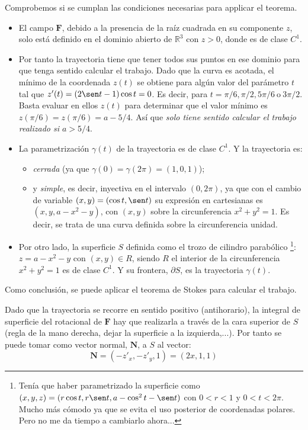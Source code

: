 \documentclass[11pt]{article}
\newcommand{\R}{\mathbb{R}}
\newcommand{\g}{\gamma}
\begin{document}
Comprobemos si se cumplan las condiciones necesarias para applicar el teorema.
\begin{itemize}
    \item El campo \( \mathbf{F}\), debido a la presencia de la raíz cuadrada en su componente \(z\), solo está definido  en el dominio abierto de \(\R^3\) con \(z>0\), donde es de clase \(C^1\).
    \item Por tanto la trayectoria tiene que tener todos sus puntos en ese dominio para que tenga sentido calcular el trabajo.
          Dado que la curva es acotada, el mínimo de la coordenada \(z(t)\) se obtiene para algún valor del parámetro \(t\) tal que \(z'(t)= (2 \sen t -1)\cos{t}=0\). Es decir, para \(t=\pi/6, \pi/2, 5\pi/6 \ \textrm{o}\  3\pi/2\). Basta evaluar en ellos \(z(t)\) para determinar que el valor mínimo es \(z(\pi/6)=z(\pi/6)=a-5/4\). Así que \emph{solo tiene sentido calcular el trabajo realizado si \(a>5/4\)}.
    \item La parametrización \( \g(t)\) de la trayectoria es de clase \(C^1\). Y la trayectoria es:
          \begin{itemize}
              \item \emph{cerrada} (ya que \(\g(0) = \g(2 \pi)=(1,0,1)\));
              \item y \emph{simple}, es decir, inyectiva en el intervalo \((0,2\pi)\), ya que con el cambio de variable \((x,y)=(\cos{t},\sen t)\) su expresión en cartesianas es \((x,y,a-x^2-y)\), con \((x,y)\) sobre la circunferencia \(x^2+y^2=1\). Es decir, se trata de una curva definida sobre la circunferencia unidad.
          \end{itemize}
    \item Por otro lado, la superficie \(S\) definida como el trozo de cilindro parabólico \footnote{Tenía que haber parametrizado la superficie como \((x,y,z)=(r \cos t,r \sen t,a- \cos^2t - \sen t)\) con \(0 < r < 1\) y \( 0 < t < 2 \pi\). Mucho más cómodo ya que se evita el uso posterior de coordenadas polares. Pero no me da tiempo a cambiarlo ahora...}: \(z=a-x^2-y\) con \((x,y) \in R\), siendo \(R\) el interior de la circunferencia \(x^2+y^2=1\) es de clase \(C^1\). Y su frontera, \(\partial S\), es la trayectoria \(\g(t)\).
\end{itemize}

Como conclusión, se puede aplicar el teorema de Stokes para calcular el trabajo.

Dado que la trayectoria se recorre en sentido positivo (antihorario), la integral de superficie del rotacional de \(\mathbf{F}\) hay que realizarla a través de la cara superior de \(S\) (regla de la mano derecha, dejar la superficie a la izquierda,...). Por tanto se puede tomar como vector normal, \(\mathbf{N}\), a \(S\) al vector:
\[\mathbf{N}=(-z'_x,-z'_y,1)= (2x,1,1)\]
\end{document}
